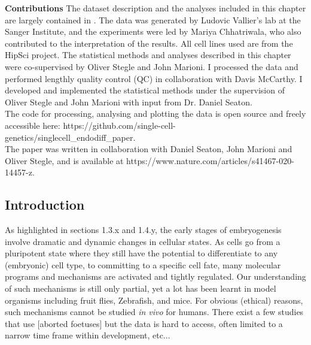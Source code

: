 \begin{Abstract}
\hspace{-3mm}\textbf{Contributions} The dataset description and the analyses included in this chapter are largely contained in \cite{cuomo2020single}. 
The data was generated by Ludovic Vallier’s lab at the Sanger Institute, and the experiments were led by Mariya Chhatriwala, who also contributed to the interpretation of the results. 
All cell lines used are from the HipSci project.
The statistical methods and analyses described in this chapter were co-supervised by Oliver Stegle and John Marioni. 
I processed the data and performed lengthly quality control (QC) in collaboration with Davis McCarthy. 
I developed and implemented the statistical methods under the supervision of Oliver Stegle and John Marioni with input from Dr. Daniel  Seaton.\\

The code for processing, analysing and plotting the data is open source and freely accessible here: https://github.com/single-cell-genetics/singlecell\_endodiff\_paper.\\ 

The paper was written in collaboration with Daniel Seaton, John Marioni and Oliver Stegle, and is available at https://www.nature.com/articles/s41467-020-14457-z.
\vfill
\end{Abstract}

\subsection{Introduction}

As highlighted in sections 1.3.x and 1.4.y, the early stages of embryogenesis involve dramatic and dynamic changes in cellular states. 
As cells go from a pluripotent state where they still have the potential to differentiate to any (embryonic) cell type, to committing to a specific cell fate, many molecular programs and mechanisms are activated and tightly regulated.
Our understanding of such mechanisms is still only partial, yet a lot has been learnt in model organisms including fruit flies, Zebrafish, and mice. 
For obvious (ethical) reasons, such mechanisms cannot be studied \textit{in vivo} for humans. 
There exist a few studies that use [aborted foetuses] but the data is hard to access, often limited to a narrow time frame within development, etc...\\

